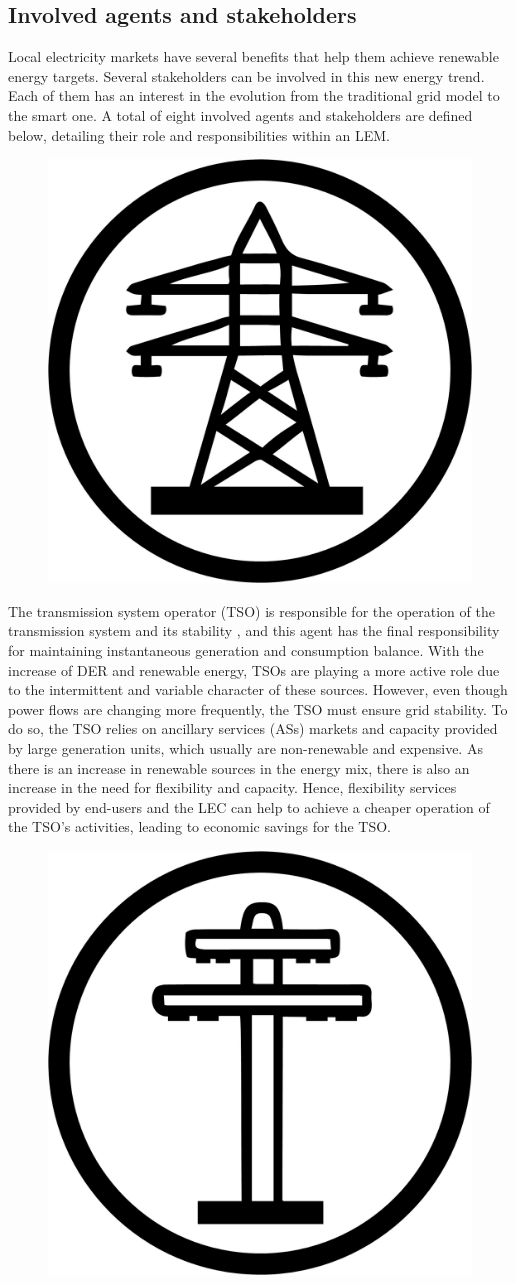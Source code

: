 \subsection{Involved agents and stakeholders}
Local electricity markets have several benefits that help them achieve renewable energy targets. Several stakeholders can be involved in this new energy trend. Each of them has an interest in the evolution from the traditional grid model to the smart one. A total of eight involved agents and stakeholders are defined below, detailing their role and responsibilities within an LEM. \newline


\begin{figure}
\centering
	\includegraphics[width=0.1\columnwidth ]{ChapterIntro/Figures/TSO.jpg}
\end{figure} 

The transmission system operator (TSO) is responsible for the operation of the transmission system and its stability \cite{VILLAR2018Flexibility}, and this agent has the final responsibility for maintaining instantaneous generation and consumption balance. With the increase of DER and renewable energy, TSOs are playing a more active role due to the intermittent and variable character of these sources. However, even though power flows are changing more frequently, the TSO must ensure grid stability. To do so, the TSO relies on ancillary services (ASs) markets and capacity provided by large generation units, which usually are non-renewable and expensive. As there is an increase in renewable sources in the energy mix, there is also an increase in the need for flexibility and capacity. Hence, flexibility services provided by end-users and the LEC can help to achieve a cheaper operation of the TSO's activities, leading to economic savings for the TSO.

\begin{figure}
	\centering
	\includegraphics[width=0.1\columnwidth ]{ChapterIntro/Figures/DSO.jpg}
	\label{DSO}  
\end{figure}


